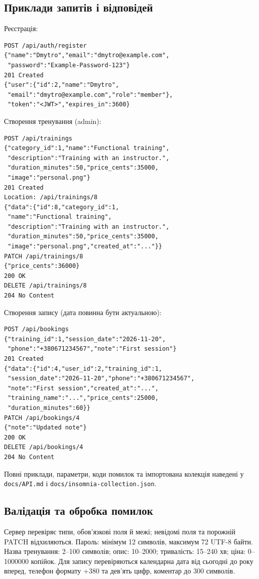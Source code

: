 \documentclass[12pt,a4paper]{article}
\newcommand{\file}[1]{\texttt{#1}}
\begin{document}
\subsection{Приклади запитів і відповідей}
Реєстрація:
\begin{verbatim}
POST /api/auth/register
{"name":"Dmytro","email":"dmytro@example.com",
 "password":"Example-Password-123"}
201 Created
{"user":{"id":2,"name":"Dmytro",
 "email":"dmytro@example.com","role":"member"},
 "token":"<JWT>","expires_in":3600}
\end{verbatim}
Створення тренування (admin):
\begin{verbatim}
POST /api/trainings
{"category_id":1,"name":"Functional training",
 "description":"Training with an instructor.",
 "duration_minutes":50,"price_cents":35000,
 "image":"personal.png"}
201 Created
Location: /api/trainings/8
{"data":{"id":8,"category_id":1,
 "name":"Functional training",
 "description":"Training with an instructor.",
 "duration_minutes":50,"price_cents":35000,
 "image":"personal.png","created_at":"..."}}
PATCH /api/trainings/8
{"price_cents":36000}
200 OK
DELETE /api/trainings/8
204 No Content
\end{verbatim}
Створення запису (дата повинна бути актуальною):
\begin{verbatim}
POST /api/bookings
{"training_id":1,"session_date":"2026-11-20",
 "phone":"+380671234567","note":"First session"}
201 Created
{"data":{"id":4,"user_id":2,"training_id":1,
 "session_date":"2026-11-20","phone":"+380671234567",
 "note":"First session","created_at":"...",
 "training_name":"...","price_cents":25000,
 "duration_minutes":60}}
PATCH /api/bookings/4
{"note":"Updated note"}
200 OK
DELETE /api/bookings/4
204 No Content
\end{verbatim}
Повні приклади, параметри, коди помилок та імпортована колекція наведені у \file{docs/API.md} і \file{docs/insomnia-collection.json}.

\subsection{Валідація та обробка помилок}
Сервер перевіряє типи, обов'язкові поля й межі; невідомі поля та порожній PATCH відхиляються. Пароль: мінімум 12 символів, максимум 72 UTF-8 байти. Назва тренування: 2--100 символів; опис: 10--2000; тривалість: 15--240 хв; ціна: 0--1000000 копійок. Для запису перевіряються календарна дата від сьогодні до року вперед, телефон формату +380 та дев'ять цифр, коментар до 300 символів.
\end{document}
